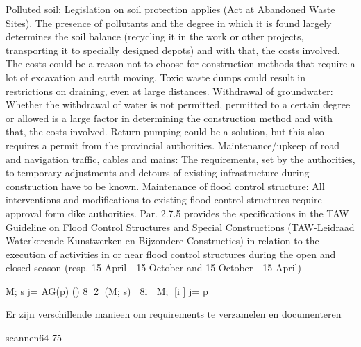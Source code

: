 Polluted soil:
Legislation on soil protection applies (Act at Abandoned Waste
Sites). The presence of pollutants and the degree in which it is
found largely determines the soil balance (recycling it in the work or
other projects, transporting it to specially designed depots) and
with that, the costs involved. The costs could be a reason not to
choose for construction methods that require a lot of excavation
and earth moving. Toxic waste dumps could result in restrictions on
draining, even at large distances.
Withdrawal of groundwater:
Whether the withdrawal of water is not permitted, permitted to a
certain degree or allowed is a large factor in determining the construction
method and with that, the costs involved. Return pumping
could be a solution, but this also requires a permit from the
provincial authorities.
Maintenance/upkeep of road and navigation traffic, cables and
mains:
The requirements, set by the authorities, to temporary adjustments
and detours of existing infrastructure during construction have to
be known.
Maintenance of flood control structure:
All interventions and modifications to existing flood control structures
require approval form dike authorities. Par. 2.7.5 provides the
specifications in the TAW Guideline on Flood Control Structures and
Special Constructions (TAW-Leidraad Waterkerende Kunstwerken
en Bijzondere Constructies) in relation to the execution of activities
in or near flood control structures during the open and closed
season (resp. 15 April - 15 October and 15 October - 15 April)


M; s j= AG(p) () 8 2 (M; s)  8i  M; [i ] j= p



Er zijn verschillende manieen om requirements te verzamelen en documenteren

scannen64-75

